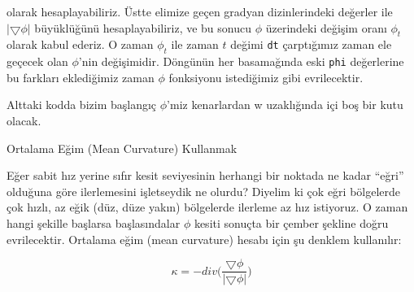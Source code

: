 \documentclass[12pt,fleqn]{article}\usepackage{../../common}
\begin{document}
olarak hesaplayabiliriz. Üstte elimize geçen gradyan dizinlerindeki
değerler ile $|\bigtriangledown\phi|$ büyüklüğünü hesaplayabiliriz, ve bu
sonucu $\phi$ üzerindeki değişim oranı $\phi_t$ olarak kabul ederiz. O
zaman $\phi_t$ ile zaman $t$ değimi \verb!dt! çarptığımız zaman ele geçecek
olan $\phi$'nin değişimidir. Döngünün her basamağında eski \verb!phi!
değerlerine bu farkları eklediğimiz zaman $\phi$ fonksiyonu istediğimiz
gibi evrilecektir.

Alttaki kodda bizim başlangıç $\phi$'miz kenarlardan w uzaklığında içi boş
bir kutu olacak. 

Ortalama Eğim (Mean Curvature) Kullanmak

Eğer sabit hız yerine sıfır kesit seviyesinin herhangi bir noktada ne kadar
``eğri'' olduğuna göre ilerlemesini işletseydik ne olurdu?  Diyelim ki çok
eğri bölgelerde çok hızlı, az eğik (düz, düze yakın) bölgelerde ilerleme az
hız istiyoruz. O zaman hangi şekille başlarsa başlasındalar $\phi$ kesiti
sonuçta bir çember şekline doğru evrilecektir. Ortalama eğim (mean
curvature) hesabı için şu denklem kullanılır:

$$ \kappa = -div \bigg( \frac{\bigtriangledown \phi}
{|\bigtriangledown \phi| } \bigg) $$

\inputminted[fontsize=\footnotesize]{python}{levelset1o.py}
\end{document}
